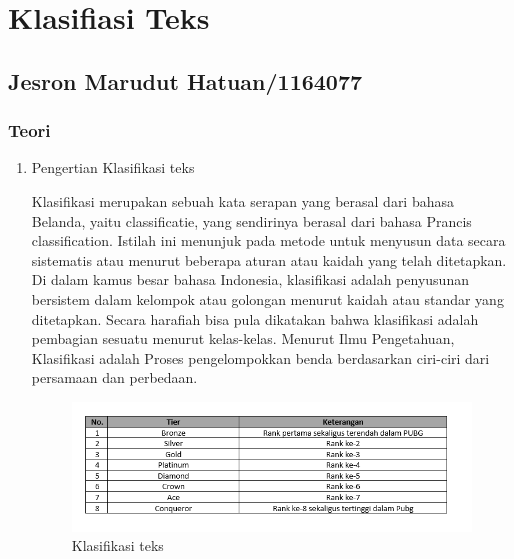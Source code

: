 \chapter{Klasifiasi Teks}
\section{Jesron Marudut Hatuan/1164077}

\subsection{Teori}
\begin{enumerate}
\item Pengertian Klasifikasi teks
\par Klasifikasi merupakan sebuah kata serapan yang berasal dari bahasa Belanda, yaitu classificatie, yang sendirinya berasal dari bahasa Prancis classification. Istilah ini menunjuk pada metode untuk menyusun data secara sistematis atau menurut beberapa aturan atau kaidah yang telah ditetapkan.
Di dalam kamus besar bahasa Indonesia, klasifikasi adalah penyusunan bersistem dalam kelompok atau golongan menurut kaidah atau standar yang ditetapkan. Secara harafiah bisa pula dikatakan bahwa klasifikasi adalah pembagian sesuatu menurut kelas-kelas. Menurut Ilmu Pengetahuan, Klasifikasi adalah Proses pengelompokkan benda berdasarkan ciri-ciri dari persamaan dan perbedaan.
\begin{figure}[ht]
\centering
\includegraphics[scale=0.5]{figures/ch4/1.png}
\caption{Klasifikasi teks}
\label{Ilustrasi Klasifikasi Teks}
\end{figure}
	

\end{enumerate}
